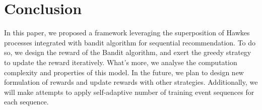 \documentclass[runningheads]{llncs}
\begin{document}
\section{Conclusion}
In this paper, we proposed a framework leveraging the superposition of Hawkes processes integrated with bandit algorithm for sequential recommendation. To do so, we design the reward of the Bandit algorithm, and exert the greedy strategy to update the reward iteratively. What's more, we analyse the computation complexity and properties of this model. In the future, we plan to design new formulation of rewards and update rewards with other strategies. Additionally, we will make attempts to apply self-adaptive number of training event sequences for each sequence.




\clearpage
\newpage
\end{document}
